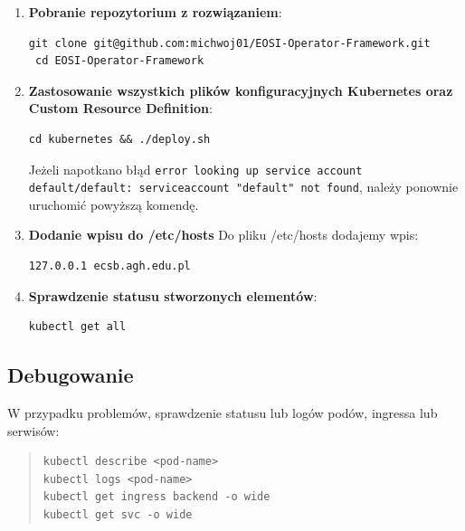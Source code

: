 \documentclass[polish]{aghengthesis}
\begin{document}
\begin{enumerate}
  \item \textbf{Pobranie repozytorium z rozwiązaniem}:
  \begin{lstlisting}[basicstyle=\ttfamily, numbers=none]
 git clone git@github.com:michwoj01/EOSI-Operator-Framework.git
 cd EOSI-Operator-Framework\end{lstlisting}\vspace{-20pt}
  \item \textbf{Zastosowanie wszystkich plików konfiguracyjnych Kubernetes oraz Custom Resource Definition}:
  \begin{lstlisting}[basicstyle=\ttfamily, numbers=none]
 cd kubernetes && ./deploy.sh\end{lstlisting}\vspace{-20pt}
  Jeżeli napotkano błąd \texttt{error looking up service account default/default: serviceaccount "default" not found}, należy ponownie uruchomić powyższą komendę.
  \item \textbf{Dodanie wpisu do /etc/hosts} Do pliku /etc/hosts dodajemy wpis:
    \begin{lstlisting}[basicstyle=\ttfamily, numbers=none]
127.0.0.1 ecsb.agh.edu.pl\end{lstlisting}\vspace{-20pt}
\newpage
  \item \textbf{Sprawdzenie statusu stworzonych elementów}:
  \begin{lstlisting}[basicstyle=\ttfamily, numbers=none]
kubectl get all\end{lstlisting}\vspace{-20pt}
\end{enumerate}

\section{Debugowanie}

W przypadku problemów, sprawdzenie statusu lub logów podów, ingressa lub serwisów:
\begin{quote}
\begin{lstlisting}[basicstyle=\ttfamily, numbers=none]
kubectl describe <pod-name>
kubectl logs <pod-name>
kubectl get ingress backend -o wide
kubectl get svc -o wide
\end{lstlisting}
\end{quote}

\chapter{\ChapterTitleSolutionSteps}
\label{sec:odtworzenie}
\end{document}
